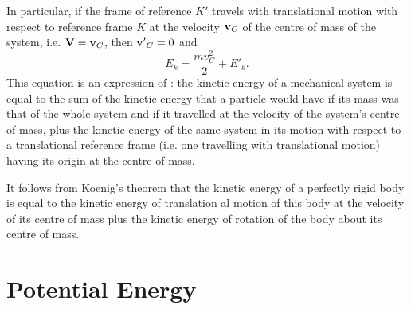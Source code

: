 In particular, if the frame of reference $K'$ travels with transla­tional motion with respect to reference frame $K$ at the velocity $\vb{v}_{C}$ of the centre of mass of the system, i.e. $\vb{V} = \vb{v}_{C}$, then $\vb{v'}_{C} = 0$ and
\begin{equation*}%
E_{k} = \frac{mv^{2}_{C}}{2} + E'_{k}.
\end{equation*}
This equation is an expression of : the kinetic energy of a mechanical system is equal to the sum of the kinetic energy that a particle would have if its mass was that of the whole system and if it travelled at the velocity of the system's centre of mass, plus the kinetic energy of the same system in its motion with respect to a translational reference frame (i.e. one travelling with translational motion) having its origin at the centre of mass.

It follows from Koenig's theorem that the kinetic energy of a perfectly rigid body is equal to the kinetic energy of translation­ al motion of this body at the velocity of its centre of mass plus the kinetic energy of rotation of the body about its centre of mass.

\section{Potential Energy}
\label{sec-3.3}

